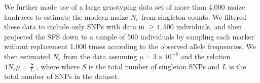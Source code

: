 \documentclass{pnastwo}
\begin{document}
\begin{article}
\begin{materials}
We further made use of a large genotyping data set of more than 4,000 maize landraces \cite{Hearne2015} to estimate the modern maize $N_e$ from singleton counts.
We filtered these data to include only SNPs with data in $\geq 1,500$ individuals, and then projected the SFS down to a sample of 500 individuals by sampling each marker without replacement 1,000 times according to the observed allele frequencies.
We then estimated $N_e$ from the data assuming $\mu = 3 \times 10^{-8}$ \cite{clark2005} and the relation  $4N_e\mu = \frac{S}{L}$ \cite{fu1993}, where where $S$ is the total number of singleton SNPs and $L$ is the total number of SNPs in the dataset.



\end{materials}
\end{article}
\end{document}
